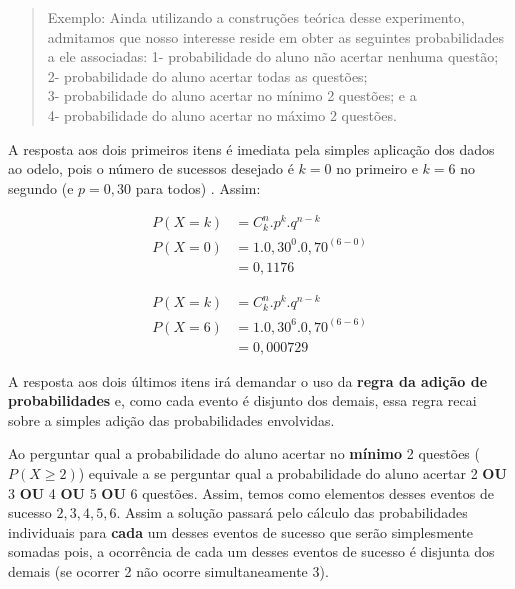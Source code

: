 \documentclass[
]{book}
\begin{document}
\hfill\break

\begin{quote}
Exemplo: Ainda utilizando a construções teórica desse experimento, admitamos que nosso interesse reside em obter as seguintes probabilidades a ele associadas:
1- probabilidade do aluno não acertar nenhuma questão;\\
2- probabilidade do aluno acertar todas as questões;\\
3- probabilidade do aluno acertar no mínimo 2 questões; e a\\
4- probabilidade do aluno acertar no máximo 2 questões.
\end{quote}

\hfill\break

A resposta aos dois primeiros itens é imediata pela simples aplicação dos dados ao odelo, pois o número de sucessos desejado é \(k=0\) no primeiro e \(k=6\) no segundo (e \(p=0,30\) para todos) . Assim:

\begin{align*}
P\left(X=k\right) & ={C}_{k}^{n}. {p}^{k}. {q}^{n-k} \\ 
P\left(X=0\right) & = 1 . 0,30^{0} . 0,70^{(6-0)} \\
                  & = 0,1176
\end{align*}

\hfill\break

\begin{align*}
P\left(X=k\right) & ={C}_{k}^{n}. {p}^{k}. {q}^{n-k} \\ 
P\left(X=6\right) & = 1 . 0,30^{6} . 0,70^{(6-6)} \\
                 & = 0,000729
\end{align*}

\hfill\break

A resposta aos dois últimos itens irá demandar o uso da \textbf{regra da adição de probabilidades} e, como cada evento é disjunto dos demais, essa regra recai sobre a simples adição das probabilidades envolvidas.

\hfill\break

Ao perguntar qual a probabilidade do aluno acertar no \textbf{mínimo} 2 questões (\(P(X \ge 2)\)) equivale a se perguntar qual a probabilidade do aluno acertar 2 \textbf{OU} 3 \textbf{OU} 4 \textbf{OU} 5 \textbf{OU} 6 questões. Assim, temos como elementos desses eventos de sucesso \({2, 3, 4, 5, 6}\). Assim a solução passará pelo cálculo das probabilidades individuais para \textbf{cada} um desses eventos de sucesso que serão simplesmente somadas pois, a ocorrência de cada um desses eventos de sucesso é disjunta dos demais (se ocorrer 2 não ocorre simultaneamente 3).
\end{document}
